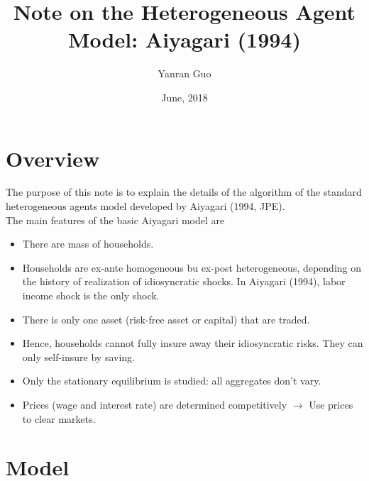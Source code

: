 \documentclass{article}
\title{Note on the Heterogeneous Agent Model: Aiyagari (1994)}
\author{Yanran Guo}
\date{June, 2018}
\begin{document}
\begin{spacing}{1.5}
\maketitle

\section*{Overview}
The purpose of this note is to explain the details of the algorithm of the standard heterogeneous agents model developed by Aiyagari (1994, JPE).\\
The main features of the basic Aiyagari model are
\begin{itemize}
\item There are mass of households. 
\item Households are ex-ante homogeneous bu ex-post heterogeneous, depending on the history of realization of idiosyncratic shocks. In Aiyagari (1994), labor income shock is the only shock.
\item There is only one asset (risk-free asset or capital) that are traded.
\item Hence, households cannot fully insure away their idiosyncratic risks. They can only self-insure by saving.
\item Only the stationary equilibrium is studied: all aggregates don't vary.
\item Prices (wage and interest rate) are determined competitively $\rightarrow$ Use prices to clear markets.
\end{itemize}
\newpage



\section{Model}
\setlength{\parindent}{2em}

\end{spacing}
\end{document}
